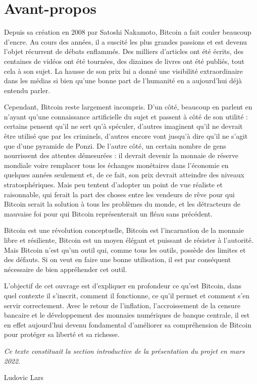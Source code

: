 
\chapter*{Avant-propos}


Depuis sa création en 2008 par Satoshi Nakamoto, Bitcoin a fait couler beaucoup d'encre. Au cours des années, il a suscité les plus grandes passions et est devenu l'objet récurrent de débats enflammés. Des milliers d'articles ont été écrits, des centaines de vidéos ont été tournées, des dizaines de livres ont été publiés, tout cela à son sujet. La hausse de son prix lui a donné une visibilité extraordinaire dans les médias si bien qu'une bonne part de l'humanité en a aujourd'hui déjà entendu parler.

Cependant, Bitcoin reste largement incompris. D'un côté, beaucoup en parlent en n'ayant qu'une connaissance artificielle du sujet et passent à côté de son utilité : certains pensent qu'il ne sert qu'à spéculer, d'autres imaginent qu'il ne devrait être utilisé que par les criminels, d'autres encore vont jusqu'à dire qu'il ne s'agit que d'une pyramide de Ponzi. De l'autre côté, un certain nombre de gens nourrissent des attentes démesurées : il devrait devenir la monnaie de réserve mondiale voire remplacer tous les échanges monétaires dans l'économie en quelques années seulement et, de ce fait, son prix devrait atteindre des niveaux stratosphériques. Mais peu tentent d'adopter un point de vue réaliste et raisonnable, qui ferait la part des choses entre les vendeurs de rêve pour qui Bitcoin serait la solution à tous les problèmes du monde, et les détracteurs de mauvaise foi pour qui Bitcoin représenterait un fléau sans précédent.

Bitcoin est une révolution conceptuelle, Bitcoin est l'incarnation de la monnaie libre et résiliente, Bitcoin est un moyen élégant et puissant de résister à l'autorité. Mais Bitcoin n'est qu'un outil qui, comme tous les outils, possède des limites et des défauts. Si on veut en faire une bonne utilisation, il est par conséquent nécessaire de bien appréhender cet outil.

L'objectif de cet ouvrage est d'expliquer en profondeur ce qu'est Bitcoin, dans quel contexte il s'inscrit, comment il fonctionne, ce qu'il permet et comment s'en servir correctement. Avec le retour de l'inflation, l'accroissement de la censure bancaire et le développement des monnaies numériques de banque centrale, il est en effet aujourd'hui devenu fondamental d'améliorer sa compréhension de Bitcoin pour protéger sa liberté et sa richesse.

\textit{Ce texte constituait la section introductive de la présentation du projet en mars 2022.}

Ludovic Lars

